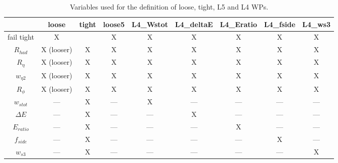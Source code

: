 

\begin{table}[!htbp]
\centering
\begin{tabular}{c|c|c|c|ccccc}
\hline
& loose & tight & loose5 & L4\_Wstot & L4\_deltaE & L4\_Eratio & L4\_fside & L4\_ws3 \\
\hline\hline
fail tight & X &  & X & X & X & X & X & X \\
\hline
$R_{had}$     &  X (looser)  &  X  &  X  &  X & X & X & X & X \\
\hline
$R_{\eta}$    &  X (looser)  &  X  &   X   &   X  &  X  &  X  &  X  &  X  \\
$w_{\eta 2}$  &  X (looser)  &  X  &   X   &   X  &  X  &  X  &  X  &  X  \\
$R_{\phi}$    &  X (looser)  &  X  &   X   &   X  &  X  &  X  &  X  &  X  \\
\hline
$w_{stot}$    &     ---      &  X  &  ---  &   X  & --- & --- & --- & --- \\
$\Delta E$    &     ---      &  X  &  ---  &  --- &  X  & --- & --- & --- \\
$E_{ratio}$   &     ---      &  X  &  ---  &  --- & --- &  X  & --- & --- \\
$f_{side}$    &     ---      &  X  &  ---  &  --- & --- & --- &  X  & --- \\
$w_{s3}$      &     ---      &  X  &  ---  &  --- & --- & --- & --- &  X  \\
\hline
\end{tabular}
%
\caption{Variables used for the definition of loose, tight, L5 and L4 WPs. }
\label{tab:loose4}
\end{table}


